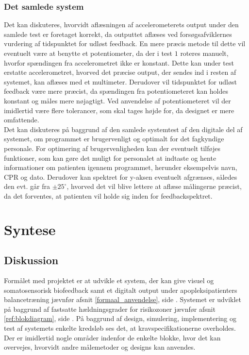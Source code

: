 \subsection{Det samlede system}
Det kan diskuteres, hvorvidt aflæsningen af accelerometerets output under den samlede test er foretaget korrekt, da outputtet aflæses ved forsøgsafviklernes vurdering af tidspunktet for udløst feedback. En mere præcis metode til dette vil eventuelt være at benytte et potentiometer, da der i test $1$ roteres manuelt, hvorfor spændingen fra accelerometret ikke er konstant. Dette kan under test erstatte accelerometret, hvorved det præcise output, der sendes ind i resten af systemet, kan aflæses med et multimeter. Derudover vil tidspunktet for udløst feedback være mere præcist, da spændingen fra potentiometeret kan holdes konstant og måles mere nøjagtigt. Ved anvendelse af potentiometeret vil der imidlertid være flere tolerancer, som skal tages højde for, da designet er mere omfattende. \\
Det kan diskuteres på baggrund af den samlede systemtest af den digitale del af systemet, om programmet er brugervenligt og optimalt for det fagkyndige personale. For optimering af brugervenligheden kan der eventuelt tilføjes funktioner, som kan gøre det muligt for personalet at indtaste og hente informationer om patienten igennem programmet, herunder eksempelvis navn, CPR og dato. Derudover kan spektret for y-aksen eventuelt afgrænses, således den evt. går fra $\pm25^{\circ}$, hvorved det vil blive lettere at aflæse målingerne præcist, da det forventes, at patienten vil holde sig inden for feedbackspektret. \\












\chapter{Syntese}
\section{Diskussion}
Formålet med projektet er at udvikle et system, der kan give visuel og somatosensorisk biofeedback samt et digitalt output under apopleksipatienters balancetræning jævnfør afsnit \ref{formaal_anvendelse}, side \pageref{formaal_anvendelse}. Systemet er udviklet på baggrund af fastsatte hældningsgrader for risikozoner jævnfør afsnit \ref{ref:blokdiagram}, side \pageref{ref:blokdiagram}. På baggrund af design, simulering, implementering og test af systemets enkelte kredsløb ses det, at kravspecifikationerne overholdes. Der er imidlertid nogle områder indenfor de enkelte blokke, hvor det kan overvejes, hvorvidt andre målemetoder og designs kan anvendes.


